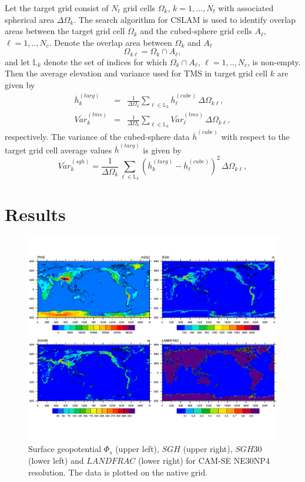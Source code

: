 \documentclass[gmd]{copernicus}
\begin{document}
Let the target grid consist of $N_t$ grid cells $\Omega_k$, $k=1, ..., N_t$ with associated spherical area $\Delta \Omega_k$. The search algorithm for CSLAM is used to identify overlap areas between the target grid cell $\Omega_k$ and the cubed-sphere grid cells $A_\ell$, $\ell=1,..,N_c$. Denote the overlap area between $\Omega_k$ and $A_\ell$
\begin{equation}
\Omega_{k\ell}=\Omega_k \cap A_\ell,
\end{equation}
and let $\mathbb{L}_k$ denote the set of indices for which $\Omega_k \cap A_\ell$, $\ell=1,..,N_c$, is non-empty. Then the average elevation and variance used for TMS in target grid cell $k$ are given by
\begin{eqnarray}
\overline{h}^{(targ)}_k&=&\frac{1}{\Delta \Omega_k}\sum_{\ell\in {\mathbb{L}}_k}\overline{h}^{(cube)}_\ell\, \Delta \Omega_{k\ell},\\
\overline{Var}^{(tms)}_k&=&\frac{1}{\Delta \Omega_k}\sum_{\ell\in {\mathbb{L}}_k}\overline{Var}^{(tms)}_\ell\, \Delta \Omega_{k\ell},
\end{eqnarray}
respectively. The variance of the cubed-sphere data $\overline{h}^{(cube)}$ with respect to the target grid cell average values $\overline{h}^{(targ)}$ is given by
\begin{equation}
\overline{Var}^{(sgh)}_k=\frac{1}{\Delta \Omega_k}\sum_{\ell\in {\mathbb{L}}_k}\left( \overline{h}^{(targ)}_k-\overline{h}^{(cube)}_\ell\right)^2\, \Delta \Omega_{k\ell},
\end{equation}


\section{Results}
\begin{figure}[t]
\vspace*{2mm}
\begin{center}
\includegraphics[width=12cm]{fig/topo-vars_global}
\end{center}
  \caption{Surface geopotential $\Phi_s$ (upper left), $SGH$ (upper right), $SGH30$ (lower left) and $LANDFRAC$ (lower right) for CAM-SE NE30NP4 resolution. The data is plotted on the native grid.}\label{fig:topo-vars}
\end{figure}
\end{document}
